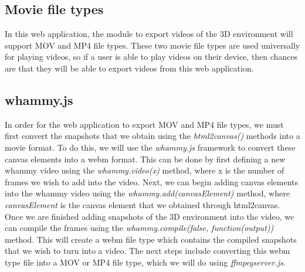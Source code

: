 \documentclass[letterpaper,10pt,titlepage, onecolumn, draftclsnofoot]{IEEEtran}
\begin{document}
\subsection{Movie file types}
In this web application, the module to export videos of the 3D environment will support MOV and MP4 file types. These two movie file types are used universally for playing videos, so if a user is able to play videos on their device, then chances are that they will be able to export videos from this web application.

\subsection{whammy.js}
In order for the web application to export MOV and MP4 file types, we must first convert the snapshots that we obtain using the \textit{html2canvas()} methods into a movie format. To do this, we will use the \textit{whammy.js\cite{whammy.js}} framework to convert these canvas elements into a webm format. \newline
\indent This can be done by first defining a new whammy video using the \textit{whammy.video(x)} method, where x is the number of frames we wish to add into the video. Next, we can begin adding canvas elements into the whammy video using the \textit{whammy.add(canvasElement)} method, where \textit{canvasElement} is the canvas element that we obtained through html2canvas. Once we are finished adding snapshots of the 3D environment into the video, we can compile the frames using the \textit{whammy.compile(false, function(output){})} method. This will create a webm file type which contains the compiled snapshots that we wish to turn into a video. The next steps include converting this webm type file into a MOV or MP4 file type, which we will do using \textit{ffmpegserver.js}. 
\end{document}
